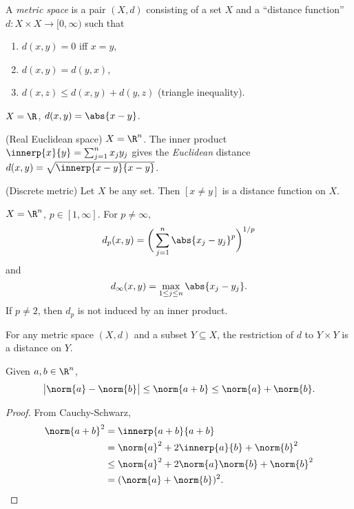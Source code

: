 \begin{definition} \label{def:metric}
    A \emph{metric space} is a pair $(X, d)$ consisting of a set $X$ and a
    ``distance function'' $d\colon X \times X \to [0, \infty)$ such that
    \begin{enumerate}[label=\small(M\arabic*)]
        \item $d(x, y) = 0$ iff $x = y$, \label{def:metric:positivity}
        \item $d(x, y) = d(y, x)$, \label{def:metric:symmetry}
        \item $d(x, z) \le d(x, y) + d(y, z)$ (triangle inequality).
            \label{def:metric:triangle}
    \end{enumerate}
\end{definition}
\begin{examples}
    \item $X = \R$, $d(x, y) = \abs{x - y}$.
    \item (Real Euclidean space) $X = \R^n$.
    The inner product $\innerp{x}{y} = \sum_{j=1}^n x_j y_j$ gives the
    \emph{Euclidean} distance $d(x, y) = \sqrt{\innerp{x - y}{x - y}}$.
    \item (Discrete metric) Let $X$ be any set.
    Then $[x \ne y]$ is a distance function on $X$.
    \item $X = \R^n$, $p \in [1, \infty]$.
    For $p \ne \infty$, \[
        d_p(x, y) = \bigg(\sum_{j=1}^n \abs{x_j - y_j}^p\bigg)^{1/p}
    \] and \[
        d_\infty(x, y) = \max_{1 \le j \le n} \abs{x_j - y_j}.
    \] If $p \ne 2$, then $d_p$ is not induced by an inner product.
    \item For any metric space $(X, d)$ and a subset $Y \subseteq X$, the
    restriction of $d$ to $Y \times Y$ is a distance on $Y$.
\end{examples}

\begin{proposition}
    Given $a, b \in \R^n$, \[
        \big\lvert\norm{a} - \norm{b}\big\rvert
            \le \norm{a + b} \le \norm{a} + \norm{b}.
    \]
\end{proposition}
\begin{proof}
    From Cauchy-Schwarz, \begin{align*}
        \norm{a + b}^2 &= \innerp{a + b}{a + b} \\
            &= \norm{a}^2 + 2\innerp{a}{b} + \norm{b}^2 \\
            &\le \norm{a}^2 + 2\norm{a}\norm{b} + \norm{b}^2 \\
            &= (\norm{a} + \norm{b})^2. \qedhere
    \end{align*}
\end{proof}
